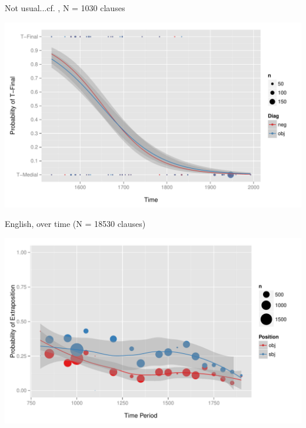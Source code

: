\documentclass[hyperref={pdfpagelabels=false}]{beamer}
\begin{document}
\begin{frame}{Not usual...cf. \citet{wallenberg2013}, N = 1030 clauses}

\begin{center}
\includegraphics[width=1.1\textwidth]{yiddishLogistic.pdf}
\end{center}
\end{frame}


\begin{frame}{English, over time (N = 18530 clauses)}

\begin{center}
\includegraphics[width=1.1\textwidth]{exSbjObjYearBinned50Loessymeb.pdf}
\end{center}
\end{frame}
\end{document}

